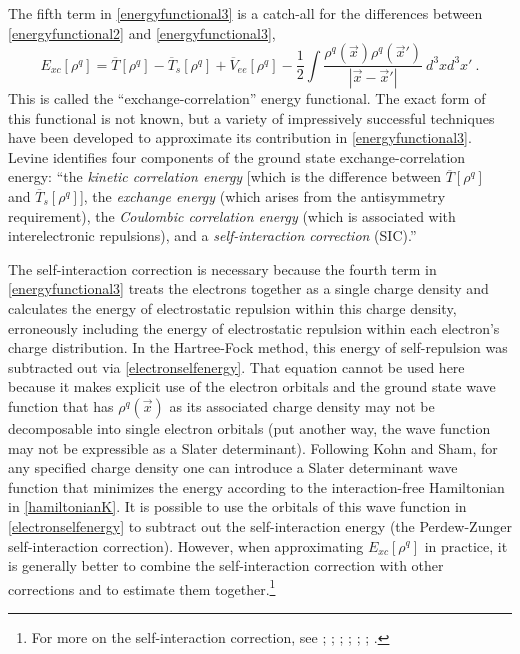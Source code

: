 \documentclass[12pt,onecolumn,secnumarabic,amsmath,amssymb,balancelastpage,nofootinbib]{article}
\begin{document}
The fifth term in \eqref{energyfunctional3} is a catch-all for the differences between \eqref{energyfunctional2} and \eqref{energyfunctional3},
\begin{equation}
E_{xc}[\rho^q] = \overline{T}[\rho^q] - \overline{T}_s[\rho^q] + \overline{V}_{ee}[\rho^q] - \frac{1}{2}\int{\frac{\rho^q(\vec{x}) \rho^q(\vec{x}')}{|\vec{x}-\vec{x}'|}\  d^3 x d^3 x'}
\ .
\end{equation}
This is called the ``exchange-correlation'' energy functional.  The exact form of this functional is not known, but a variety of impressively successful techniques have been developed to approximate its contribution in \eqref{energyfunctional3}.  Levine \cite[pg. 559]{levineQC} identifies four components of the ground state exchange-correlation energy: ``the \emph{kinetic correlation energy} [which is the difference between $\overline{T}[\rho^q]$ and $\overline{T}_s[\rho^q]$], the \emph{exchange energy} (which arises from the antisymmetry requirement), the \emph{Coulombic correlation energy} (which is associated with interelectronic repulsions), and a \emph{self-interaction correction} (SIC).''

The self-interaction correction is necessary because the fourth term in \eqref{energyfunctional3} treats the electrons together as a single charge density and calculates the energy of electrostatic repulsion within this charge density, erroneously including the energy of electrostatic repulsion within each electron's charge distribution.  In the Hartree-Fock method, this energy of self-repulsion was subtracted out via \eqref{electronselfenergy}.  That equation cannot be used here because it makes explicit use of the electron orbitals and the ground state wave function that has $\rho^q(\vec{x})$ as its associated charge density may not be decomposable into single electron orbitals (put another way, the wave function may not be expressible as a Slater determinant).  Following Kohn and Sham, for any specified charge density one can introduce a Slater determinant wave function that minimizes the energy according to the interaction-free Hamiltonian in \eqref{hamiltonianK}.  It is possible to use the orbitals of this wave function in \eqref{electronselfenergy} to subtract out the self-interaction energy (the Perdew-Zunger self-interaction correction).  However, when approximating $E_{xc}[\rho^q]$ in practice, it is generally better to combine the self-interaction correction with other corrections and to estimate them together.\footnote{For more on the self-interaction correction, see \cite{perdew1981}; \cite[sec.\ 8.3]{parryang}; \cite{baerends1997, baerends2005}; \cite[footnote 33]{argaman2000}; \cite[sec.\ 2.3 \& 6.7]{koch2001}; \cite[sec.\ 4.7]{engel2011}; \cite{tsuneda2014}.}
\end{document}
